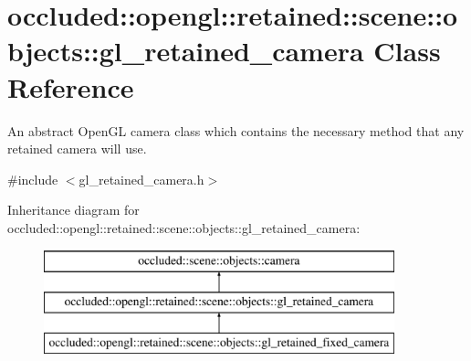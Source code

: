 \hypertarget{classoccluded_1_1opengl_1_1retained_1_1scene_1_1objects_1_1gl__retained__camera}{\section{occluded\+:\+:opengl\+:\+:retained\+:\+:scene\+:\+:objects\+:\+:gl\+\_\+retained\+\_\+camera Class Reference}
\label{classoccluded_1_1opengl_1_1retained_1_1scene_1_1objects_1_1gl__retained__camera}
}


An abstract Open\+G\+L camera class which contains the necessary method that any retained camera will use.  




{\ttfamily \#include $<$gl\+\_\+retained\+\_\+camera.\+h$>$}

Inheritance diagram for occluded\+:\+:opengl\+:\+:retained\+:\+:scene\+:\+:objects\+:\+:gl\+\_\+retained\+\_\+camera\+:\begin{figure}[H]
\begin{center}
\leavevmode
\includegraphics[height=3.000000cm]{classoccluded_1_1opengl_1_1retained_1_1scene_1_1objects_1_1gl__retained__camera}
\end{center}
\end{figure}
